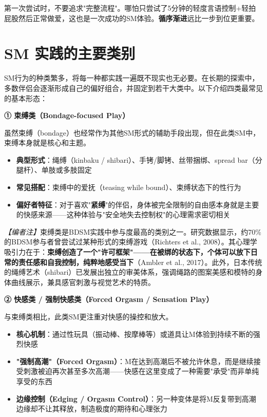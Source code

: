 \documentclass[12pt,UTF8]{ctexbook}
\begin{document}
\begin{tcolorbox}[colback=pink!5!white,colframe=red!50!black,title=贴心小叮咛]
第一次尝试时，不要追求"完整流程"。哪怕只尝试了5分钟的轻度言语控制+轻拍屁股然后正常做爱，这也是一次成功的SM体验。\textbf{循序渐进}远比一步到位更重要。
\end{tcolorbox}

\section{SM 实践的主要类别}

SM行为的种类繁多，将每一种都实践一遍既不现实也无必要。在长期的探索中，多数伴侣会逐渐形成自己的偏好组合，并固定到若干大类中。以下介绍四类最常见的基本形态：

\noindent\textbf{① 束缚类（Bondage-focused Play）}

虽然束缚（bondage）也经常作为其他SM形式的辅助手段出现，但在此类SM中，束缚本身就是核心和主题。

\begin{itemize}
	\item \textbf{典型形式}：绳缚（kinbaku / shibari）、手铐/脚铐、丝带捆绑、spread bar（分腿杆）、单肢或多肢固定
	\item \textbf{常见搭配}：束缚中的爱抚（teasing while bound）、束缚状态下的性行为
	\item \textbf{偏好者特征}：对于喜欢"\textbf{紧缚}"的伴侣，身体被完全限制的自由感本身就是主要的快感来源——这种体验与"安全地失去控制权"的心理需求密切相关
\end{itemize}

\textit{【编者注】}束缚类是BDSM实践中参与度最高的类别之一。研究数据显示，约70\%的BDSM参与者曾尝试过某种形式的束缚游戏（Richters et al., 2008）。其心理学吸引力在于：\textbf{束缚创造了一个"许可框架"——在被绑的状态下，个体可以放下日常的责任感和自我控制，纯粹地感受当下}（Ambler et al., 2017）。此外，日本传统的绳缚艺术（shibari）已发展出独立的审美体系，强调绳路的图案美感和模特的身体曲线展示，兼具感官刺激与视觉艺术的特质。

\noindent\textbf{② 快感类 / 强制快感类（Forced Orgasm / Sensation Play）}

与束缚类相比，此类SM更注重对快感的操控和放大。

\begin{itemize}
	\item \textbf{核心机制}：通过性玩具（振动棒、按摩棒等）或道具让M体验到持续不断的强烈快感
	\item \textbf{"强制高潮"（Forced Orgasm）}：M在达到高潮后不被允许休息，而是继续接受刺激被迫再次甚至多次高潮——快感在这里变成了一种需要"承受"而非单纯享受的东西
	\item \textbf{边缘控制（Edging / Orgasm Control）}：另一种变体是将M反复带到高潮边缘却不让其释放，制造极度的期待和心理张力
\end{itemize}
\end{document}
